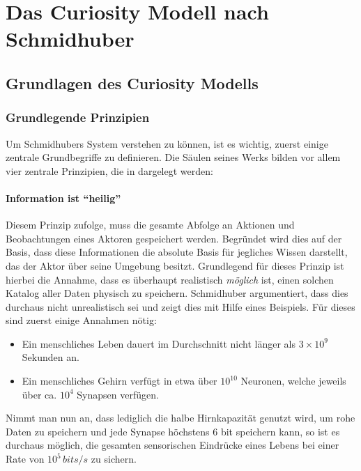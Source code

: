 
\section{Das Curiosity Modell nach Schmidhuber}
\label{sec:Curiosity_Schmidhuber}

\subsection{Grundlagen des Curiosity Modells}

\subsubsection{Grundlegende Prinzipien}
\label{sec:Grundlegende_Prinzipien}

Um Schmidhubers System verstehen zu können, ist es wichtig, zuerst einige zentrale Grundbegriffe zu definieren.
Die Säulen seines Werks bilden vor allem vier zentrale Prinzipien, die in  dargelegt werden:

\paragraph{Information ist ``heilig''}
\label{sec:Information_Heilig}
Diesem Prinzip zufolge, muss die gesamte Abfolge an Aktionen und Beobachtungen eines Aktoren gespeichert werden. Begründet wird dies auf der Basis, dass diese Informationen die absolute Basis für jegliches Wissen darstellt, das der Aktor über seine Umgebung besitzt. 
Grundlegend für dieses Prinzip ist hierbei die Annahme, dass es überhaupt realistisch \emph{möglich} ist, einen solchen Katalog aller Daten physisch zu speichern.
Schmidhuber argumentiert, dass dies durchaus nicht unrealistisch sei und zeigt dies mit Hilfe eines Beispiels. 
Für dieses sind zuerst einige Annahmen nötig: 
\begin{itemize}
    \item Ein menschliches Leben dauert im Durchschnitt nicht länger als \(3\times10^9\) Sekunden an.
    \item Ein menschliches Gehirn verfügt in etwa über \(10^{10}\) Neuronen, welche jeweils über ca. \(10^{4}\) Synapsen verfügen.
\end{itemize}
Nimmt man nun an, dass lediglich die halbe Hirnkapazität genutzt wird, um rohe Daten zu speichern und jede Synapse höchstens 6 bit speichern kann, so ist es durchaus möglich, die gesamten sensorischen Eindrücke eines Lebens bei einer Rate von \(10^5\, bits/s\) zu sichern.

